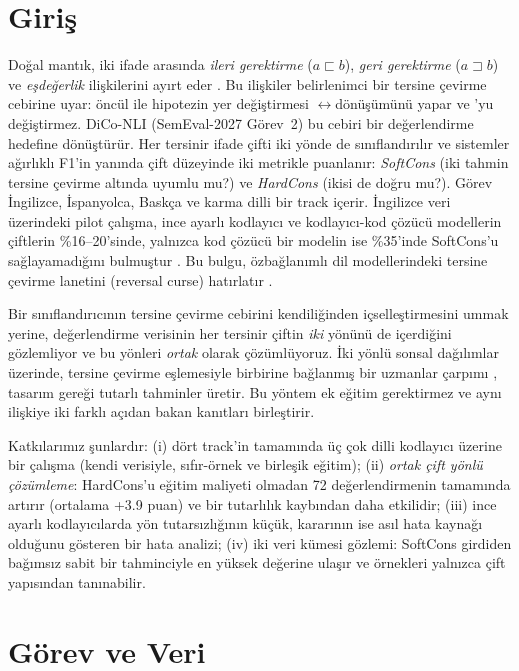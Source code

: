 \section{Giriş}

Doğal mantık, iki ifade arasında \emph{ileri gerektirme} ($a \sqsubset b$), \emph{geri gerektirme} ($a \sqsupset b$) ve \emph{eşdeğerlik} ilişkilerini ayırt eder \citep{maccartney2009natural}. Bu ilişkiler belirlenimci bir tersine çevirme cebirine uyar: öncül ile hipotezin yer değiştirmesi \FE$\leftrightarrow$\BE dönüşümünü yapar ve \EQ'yu değiştirmez. DiCo-NLI (SemEval-2027 Görev~2) bu cebiri bir değerlendirme hedefine dönüştürür. Her tersinir ifade çifti iki yönde de sınıflandırılır ve sistemler ağırlıklı F1'in yanında çift düzeyinde iki metrikle puanlanır: \emph{SoftCons} (iki tahmin tersine çevirme altında uyumlu mu?) ve \emph{HardCons} (ikisi de doğru mu?). Görev İngilizce, İspanyolca, Baskça ve karma dilli bir track içerir. İngilizce veri üzerindeki pilot çalışma, ince ayarlı kodlayıcı ve kodlayıcı-kod çözücü modellerin çiftlerin \%16--20'sinde, yalnızca kod çözücü bir modelin ise \%35'inde SoftCons'u sağlayamadığını bulmuştur \citep{apaolaza2026assessing}. Bu bulgu, özbağlanımlı dil modellerindeki tersine çevirme lanetini (reversal curse) hatırlatır \citep{berglund2024reversal}.

Bir sınıflandırıcının tersine çevirme cebirini kendiliğinden içselleştirmesini ummak yerine, değerlendirme verisinin her tersinir çiftin \emph{iki} yönünü de içerdiğini gözlemliyor ve bu yönleri \emph{ortak} olarak çözümlüyoruz. İki yönlü sonsal dağılımlar üzerinde, tersine çevirme eşlemesiyle birbirine bağlanmış bir uzmanlar çarpımı \citep{hinton2002training}, tasarım gereği tutarlı tahminler üretir. Bu yöntem ek eğitim gerektirmez ve aynı ilişkiye iki farklı açıdan bakan kanıtları birleştirir.

Katkılarımız şunlardır:
(i) dört track'in tamamında üç çok dilli kodlayıcı üzerine bir çalışma (kendi verisiyle, sıfır-örnek ve birleşik eğitim);
(ii) \emph{ortak çift yönlü çözümleme}: HardCons'u eğitim maliyeti olmadan 72 değerlendirmenin tamamında artırır (ortalama +3.9 puan) ve bir tutarlılık kaybından daha etkilidir;
(iii) ince ayarlı kodlayıcılarda yön tutarsızlığının küçük, \NO kararının ise asıl hata kaynağı olduğunu gösteren bir hata analizi;
(iv) iki veri kümesi gözlemi: SoftCons girdiden bağımsız sabit bir tahminciyle en yüksek değerine ulaşır ve \NO örnekleri yalnızca çift yapısından tanınabilir.

\section{Görev ve Veri}
\label{sec:task}

